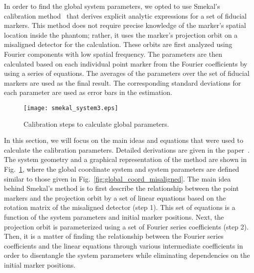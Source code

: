 In order to find the global system parameters, we opted to use Smekal's calibration method~\citep{Smekal2004} that derives explicit analytic expressions for a set of fiducial markers.  This method does not require precise knowledge of the marker's spatial location inside the phantom; rather, it uses the marker's projection orbit on a misaligned detector for the calculation.  These orbits are first analyzed using Fourier components with low spatial frequency.  The parameters are then calculated based on each individual point marker from the Fourier coefficients by using a series of equations.  The averages of the parameters over the set of fiducial markers are used as the final result.  The corresponding standard deviations for each parameter are used as error bars in the estimation.
%
\begin{figure}[ht]
\texttt{[image: smekal\_system3.eps]}
\caption{Calibration steps to calculate global parameters.}
\label{fig:smekal_method}
\end{figure}

In this section, we will focus on the main ideas and equations that were used to calculate the calibration parameters.  Detailed derivations are given in the paper~\citep{Smekal2004}.  The system geometry and a graphical representation of the method are shown in Fig.~\ref{fig:smekal_method}, where the global coordinate system and system parameters are defined similar to those given in Fig.~\ref{fig:global_coord_misaligned}. The main idea behind Smekal's method is to first describe the relationship between the point markers and the projection orbit by a set of linear equations based on the rotation matrix of the misaligned detector (step 1). This set of equations is a function of the system parameters and initial marker positions.  Next, the projection orbit is parameterized using a set of Fourier series coefficients (step 2).  Then, it is a matter of finding the relationship between the Fourier series coefficients and the linear equations through various intermediate coefficients in order to disentangle the system parameters while eliminating dependencies on the initial marker positions.

